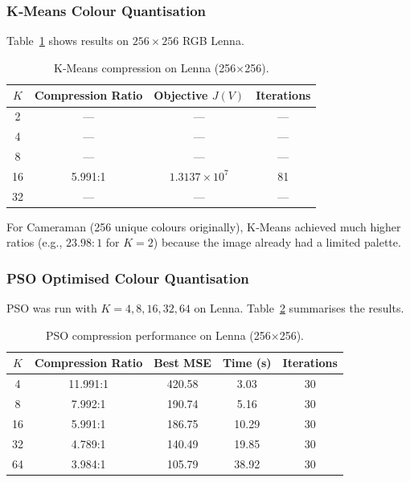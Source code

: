 \subsubsection{K‑Means Colour Quantisation}
Table~\ref{tab:kmeans_lenna} shows results on $256\times256$ RGB Lenna.

\begin{table}[H]
\centering
\caption{K‑Means compression on Lenna (256×256).}
\label{tab:kmeans_lenna}
\begin{tabular}{c c c c}
\hline
$K$ & \textbf{Compression Ratio} & \textbf{Objective $J(V)$} & \textbf{Iterations} \\
\hline
2 & — & — & — \\
4 & — & — & — \\
8 & — & — & — \\
16 & 5.991:1 & $1.3137\times10^7$ & 81 \\
32 & — & — & — \\
\hline
\end{tabular}
\end{table}

For Cameraman (256 unique colours originally), K‑Means achieved much higher ratios (e.g., $23.98:1$ for $K=2$) because the image already had a limited palette.

\subsubsection{PSO Optimised Colour Quantisation}
PSO was run with $K=4,8,16,32,64$ on Lenna. Table~\ref{tab:pso_performance} summarises the results.

\begin{table}[H]
\centering
\small
\caption{PSO compression performance on Lenna (256×256).}
\label{tab:pso_performance}
\begin{tabular}{c c c c c}
\hline
$K$ & \textbf{Compression Ratio} & \textbf{Best MSE} & \textbf{Time (s)} & \textbf{Iterations} \\
\hline
4  & 11.991:1 & 420.58 & 3.03 & 30 \\
8  & 7.992:1  & 190.74 & 5.16 & 30 \\
16 & 5.991:1  & 186.75 & 10.29 & 30 \\
32 & 4.789:1  & 140.49 & 19.85 & 30 \\
64 & 3.984:1  & 105.79 & 38.92 & 30 \\
\hline
\end{tabular}
\end{table}


